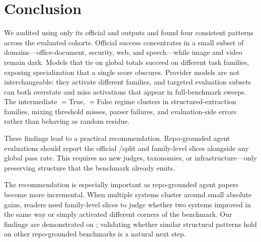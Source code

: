 \section{Conclusion}

We audited \gittaskbench using only its official \processmetric and
\resultmetric outputs and found four consistent patterns across the evaluated
cohorts. Official success concentrates in a small subset of
domains---office-document, security, web, and speech---while image and video
remain dark. Models that tie on global totals succeed on different task
families, exposing specialization that a single score obscures. Provider models
are not interchangeable: they activate different families, and targeted
evaluation subsets can both overstate and miss activations that appear in
full-benchmark sweeps. The intermediate \processmetric$=$True,
\resultmetric$=$False regime clusters in structured-extraction families, mixing
threshold misses, parser failures, and evaluation-side errors rather than
behaving as random residue.

These findings lead to a practical recommendation. Repo-grounded agent
evaluations should report the official \processmetric/\resultmetric split and
family-level slices alongside any global pass rate. This requires no new
judges, taxonomies, or infrastructure---only preserving structure that the
benchmark already emits.

The recommendation is especially important as repo-grounded agent papers become
more incremental. When multiple systems cluster around small absolute gains,
readers need family-level slices to judge whether two systems improved in the
same way or simply activated different corners of the benchmark. Our findings
are demonstrated on \gittaskbench; validating whether similar structural
patterns hold on other repo-grounded benchmarks is a natural next step.

